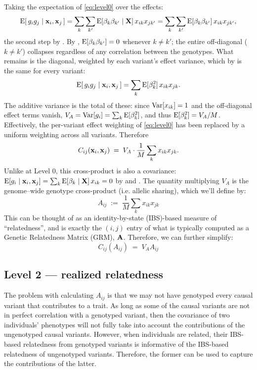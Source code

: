 \documentclass[12pt]{article}
\begin{document}
Taking the expectation of \eqref{eq:level0} over the effects:
$$
    \mathrm{E}[\,g_i g_j \mid \mathbf{x}_i, \mathbf{x}_j \,]
    = \sum_{k}\sum_{k'} \mathrm{E}[\beta_k \beta_{k'} \mid \mathbf{X}]\, x_{ik} x_{jk'}
    = \sum_{k}\sum_{k'} \mathrm{E}[\beta_k \beta_{k'}]\, x_{ik} x_{jk'} ,
$$
the second step by .
By , $\mathrm{E}[\beta_k\beta_{k'}] = 0$ whenever $k\neq k'$; the entire off-diagonal ($k\neq k'$) collapses regardless of any correlation between the genotypes.
What remains is the diagonal, weighted by each variant's effect variance, which by  is the same for every variant:
$$
    \mathrm{E}[\,g_i g_j \mid \mathbf{x}_i, \mathbf{x}_j \,]
    = \sum_{k} \mathrm{E}[\beta_k^2]\, x_{ik} x_{jk}.
$$
The additive variance is the total of these: since $\mathrm{Var}[x_{ik}]=1$ and the off-diagonal effect terms vanish, $V_A = \mathrm{Var}[g_i] = \sum_k \mathrm{E}[\beta_k^2]$, and thus $\mathrm{E}[\beta_k^2] = V_A/M$.
Effectively, the per-variant effect weighting of \eqref{eq:level0} has been replaced by a uniform weighting across all variants.
Therefore
\begin{equation}
    C_{ij}(\mathbf{x}_i, \mathbf{x}_j) \;=\; V_A \cdot \frac{1}{M}\sum_{k} x_{ik} x_{jk} .
\end{equation}
Unlike at Level 0, this cross-product is also a covariance: $\mathrm{E}[g_i \mid \mathbf{x}_i, \mathbf{x}_j] = \sum_k \mathrm{E}[\beta_k \mid \mathbf{X}]\, x_{ik} = 0$ by  and .
The quantity multiplying $V_A$ is the genome--wide genotype cross-product (i.e. allelic sharing), which we'll define by:
\begin{equation}\label{eq:A-def}
    A_{ij} \;:=\; \frac{1}{M}\sum_{k} x_{ik} x_{jk}
\end{equation}
This can be thought of as an identity-by-state (IBS)-based measure of ``relatedness'', and is exactly the $(i,j)$ entry of what is typically computed as a Genetic Relatedness Matrix (GRM), $\mathbf{A}$.
Therefore, we can further simplify:
\begin{equation}\label{eq:level1}
    \boxed{ C_{ij}(A_{ij}) \;=\; V_A A_{ij} }
\end{equation}

\subsection{Level 2 --- realized relatedness}
The problem with calculating $A_{ij}$ is that we may not have genotyped every causal variant that contributes to a trait.
As long as some of the causal variants are not in perfect correlation with a genotyped variant, then the covariance of two individuals' phenotypes will not fully take into account the contributions of the ungenotyped causal variants.
However, when individuals are related, their IBS-based relatedness from genotyped variants is informative of the IBS-based relatedness of ungenotyped variants.
Therefore, the former can be used to capture the contributions of the latter.
\end{document}
